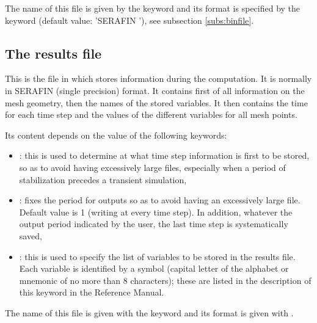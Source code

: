The name of this file is given by the keyword  and its
format is specified by the keyword  (default
value: 'SERAFIN '), see subsection \ref{subs:binfile}.


\subsection{The results file}

This is the file in which  stores information during the computation.
It is normally in SERAFIN (single precision) format.
It contains first of all information on the mesh geometry,
then the names of the stored variables.
It then contains the time for each time step and the values of the different
variables for all mesh points.

Its content depends on the value of the following keywords:
\begin{itemize}
\item {}:
this is used to determine at what time step information is first to be stored,
so as to avoid having excessively large files, especially when a period of
stabilization precedes a transient simulation,

\item {}:
fixes the period for outputs so as to avoid having an excessively large file.
Default value is 1 (writing at every time step).
In addition, whatever the output period indicated by the user,
the last time step is systematically saved,

\item {}:
this is used to specify the list of variables to be stored in the results file.
Each variable is identified by a symbol (capital letter of the alphabet
or mnemonic of no more than 8 characters);
these are listed in the description of this keyword in the Reference Manual.


\end{itemize}

The name of this file is given with the keyword 
and its format is given with .

